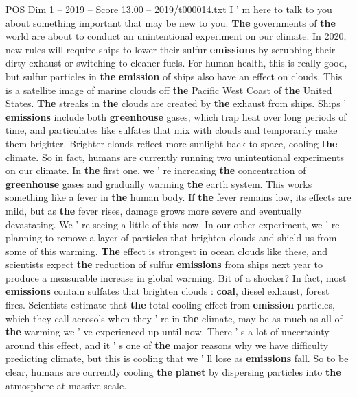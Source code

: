 \begin{textsample}{POS Dim 1 – 2019 – Score 13.00 – 2019/t000014.txt}  \label{ex:f1_pos_059}
I ' m here to talk to you about something important that may be new to you. \textbf{The} governments of \textbf{the} world are about to conduct an unintentional experiment on our climate.
In 2020, new rules will require ships to lower their sulfur \textbf{emissions} by scrubbing their dirty exhaust or switching to cleaner fuels.
For human health, this is really good, but sulfur particles in \textbf{the} \textbf{emission} of ships also have an effect on clouds.
This is a satellite image of marine clouds off \textbf{the} Pacific West Coast of \textbf{the} United States. \textbf{The} streaks in \textbf{the} clouds are created by \textbf{the} exhaust from ships.
Ships ' \textbf{emissions} include both \textbf{greenhouse} gases, which trap heat over long periods of time, and particulates like sulfates that mix with clouds and temporarily make them brighter.
Brighter clouds reflect more sunlight back to space, cooling \textbf{the} climate.
So in fact, humans are currently running two unintentional experiments on our climate.
In \textbf{the} first one, we ' re increasing \textbf{the} concentration of \textbf{greenhouse} gases and gradually warming \textbf{the} earth system.
This works something like a fever in \textbf{the} human body.
If \textbf{the} fever remains low, its effects are mild, but as \textbf{the} fever rises, damage grows more severe and eventually devastating.
We ' re seeing a little of this now.
In our other experiment, we ' re planning to remove a layer of particles that brighten clouds and shield us from some of this warming. \textbf{The} effect is strongest in ocean clouds like these, and scientists expect \textbf{the} reduction of sulfur \textbf{emissions} from ships next year to produce a measurable increase in global warming.
Bit of a shocker?
In fact, most \textbf{emissions} contain sulfates that brighten clouds : \textbf{coal}, diesel exhaust, forest fires.
Scientists estimate that \textbf{the} total cooling effect from \textbf{emission} particles, which they call aerosols when they ' re in \textbf{the} climate, may be as much as all of \textbf{the} warming we ' ve experienced up until now.
There ' s a lot of uncertainty around this effect, and it ' s one of \textbf{the} major reasons why we have difficulty predicting climate, but this is cooling that we ' ll lose as \textbf{emissions} fall.
So to be clear, humans are currently cooling \textbf{the} \textbf{planet} by dispersing particles into \textbf{the} atmosphere at massive scale.

\end{textsample}
